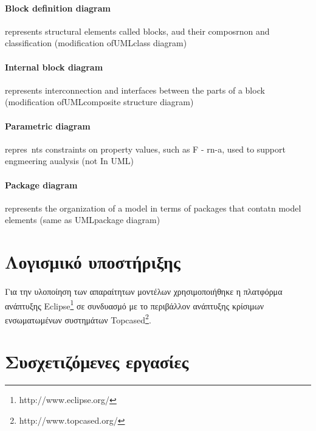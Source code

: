 \documentclass[a4paper,12pt,twoside]{report}
\begin{document}
{			\paragraph{Block definition diagram} {represents structural elements called blocks, aud their composrnon and classification (modification ofUMLclass diagram)
			}
			\paragraph{Internal block diagram} {represents interconnection and interfaces between the parts of a block (modification ofUMLcomposite structure diagram)
			}
			\paragraph{Parametric diagram} {repres~nts constraints on property values, such as F - rn-a, used to support engmeering aualysis
			(not In UML)
			}
			\paragraph{Package diagram} {represents the organization of a model in terms of packages that contatn model elements (same as UMLpackage diagram)
			}
					
		\section{Λογισμικό υποστήριξης}
		
			\paragraph{} {Για την υλοποίηση των απαραίτητων μοντέλων χρησιμοποιήθηκε η πλατφόρμα ανάπτυξης Eclipse\footnote{http://www.eclipse.org/} σε συνδυασμό με το περιβάλλον ανάπτυξης κρίσιμων ενσωματωμένων συστημάτων Topcased\footnote{http://www.topcased.org/}.
			}
			
	\section{Συσχετιζόμενες εργασίες}
}
\end{document}

